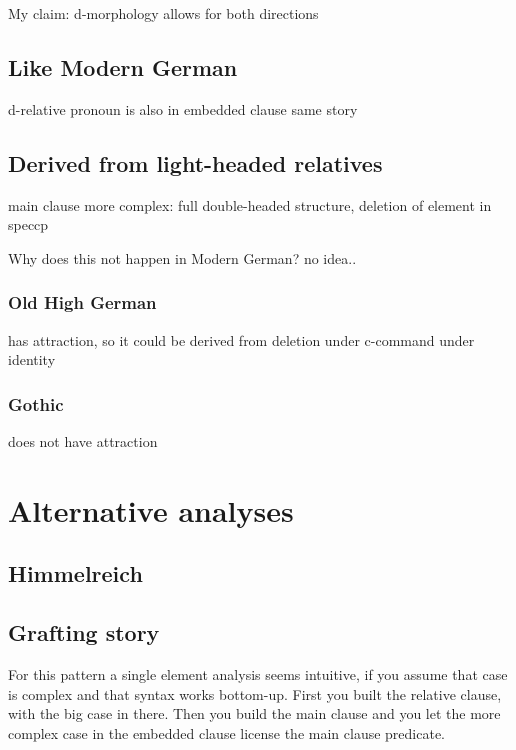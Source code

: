 My claim: d-morphology allows for both directions

\subsection{Like Modern German}

d-relative pronoun is also in embedded clause
same story

\subsection{Derived from light-headed relatives}

main clause more complex: full double-headed structure, deletion of element in speccp

Why does this not happen in Modern German? no idea..

\subsubsection{Old High German}

has attraction, so it could be derived from deletion under c-command under identity

\subsubsection{Gothic}

does not have attraction








\section{Alternative analyses}

\subsection{Himmelreich}



\subsection{Grafting story}

For this pattern a single element analysis seems intuitive, if you assume that case is complex and that syntax works bottom-up. First you built the relative clause, with the big case in there. Then you build the main clause and you let the more complex case in the embedded clause license the main clause predicate.

